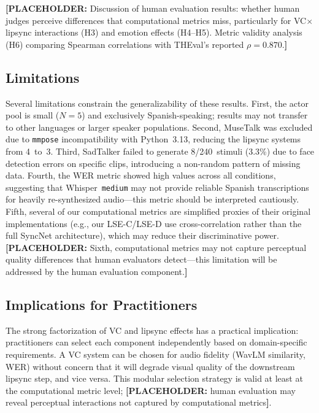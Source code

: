 \documentclass[11pt,a4paper]{article}
\newcommand{\placeholder}[1]{\textcolor{red!70!black}{\textbf{[PLACEHOLDER:} #1\textbf{]}}}
\begin{document}
\placeholder{Discussion of human evaluation results: whether human judges perceive differences that computational metrics miss, particularly for VC$\times$lipsync interactions (H3) and emotion effects (H4--H5). Metric validity analysis (H6) comparing Spearman correlations with THEval's reported $\rho=0.870$.}

\subsection{Limitations}

Several limitations constrain the generalizability of these results.
First, the actor pool is small ($N=5$) and exclusively Spanish-speaking; results may not transfer to other languages or larger speaker populations.
Second, MuseTalk was excluded due to \texttt{mmpose} incompatibility with Python~3.13, reducing the lipsync systems from 4~to~3.
Third, SadTalker failed to generate 8/240~stimuli (3.3\%) due to face detection errors on specific clips, introducing a non-random pattern of missing data.
Fourth, the WER metric showed high values across all conditions, suggesting that Whisper~\texttt{medium} may not provide reliable Spanish transcriptions for heavily re-synthesized audio---this metric should be interpreted cautiously.
Fifth, several of our computational metrics are simplified proxies of their original implementations (e.g., our LSE-C/LSE-D use cross-correlation rather than the full SyncNet architecture), which may reduce their discriminative power.
\placeholder{Sixth, computational metrics may not capture perceptual quality differences that human evaluators detect---this limitation will be addressed by the human evaluation component.}

\subsection{Implications for Practitioners}

The strong factorization of VC and lipsync effects has a practical implication: practitioners can select each component independently based on domain-specific requirements.
A VC system can be chosen for audio fidelity (WavLM similarity, WER) without concern that it will degrade visual quality of the downstream lipsync step, and vice versa.
This modular selection strategy is valid at least at the computational metric level; \placeholder{human evaluation may reveal perceptual interactions not captured by computational metrics}.

\end{document}
